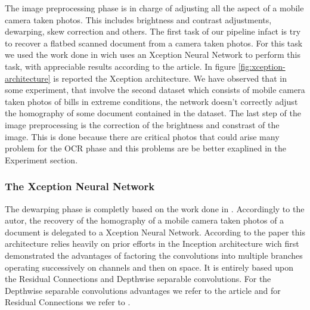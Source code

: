 \documentclass[10pt,twocolumn,letterpaper]{article}
\begin{document}
The image preprocessing phase is in charge of adjusting all the aspect
of a mobile camera taken photos. This includes brightness and contrast
adjustments, dewarping, skew correction and others. The first task of
our pipeline infact is try to recover a flatbed scanned document from
a camera taken photos. For this task we used the work done in
\cite{Korber18} wich uses an Xception Neural Network
\cite{xception_NN} to perform this task, with appreciable results
according to the article. In figure \ref{fig:xception-architecture} is
reported the Xception architecture.
We have observed
that in some experiment, that involve the second dataset which
consists of mobile camera taken photos of bills in extreme conditions,
the network doesn't correctly adjust the homography of some document
contained in the dataset. The last step of the image preprocessing is
the correction of the brightness and constrast of the image. This is
done because there are critical photos that could arise many problem
for the OCR phase and this problems are be better exaplined in the
Experiment section.

\subsubsection{The Xception Neural Network}

The dewarping phase is completly based on the work done in
\cite{Korber18}. Accordingly to the autor, the recovery of the
homography of a mobile camera taken photos of a document is delegated
to a Xception Neural Network. According to the paper \cite{xception}
this architecture relies heavily on prior efforts in the Inception
architecture wich first demonstrated the advantages of factoring the
convolutions into multiple branches operating successively on channels
and then on space. It is entirely based upon the Residual Connections
and Depthwise separable convolutions. For the Depthwise separable
convolutions advantages we refer to the article \cite{Wang18}
and for Residual Connections we refer to \cite{Sahoo17}.
\end{document}
